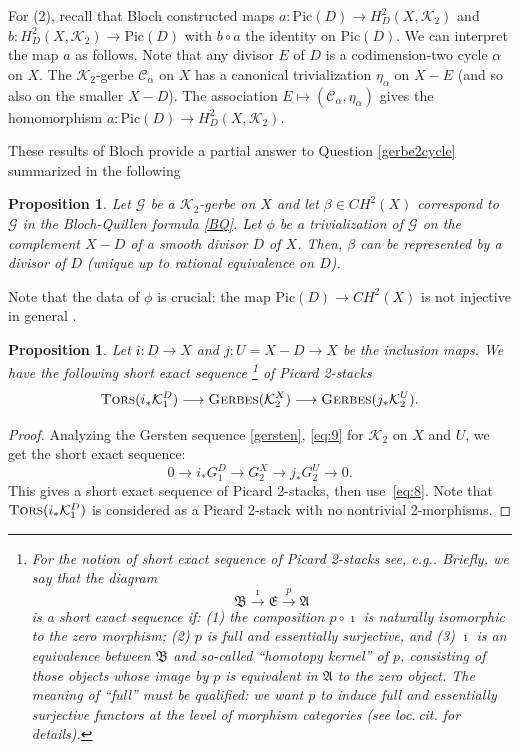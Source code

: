 \documentclass{amsart}
\numberwithin{equation}{subsection}
\newtheorem{proposition}[theorem]{Proposition}
\theoremstyle{remark}
\theoremstyle{remark}
\newcommand{\eg}{e.g.\xspace}
\newcommand{\loccit}{\textit{loc.\,cit.}\xspace}
\newcommand{\too}{\longrightarrow}%
\newcommand{\cC}{\mathcal{C}}
\newcommand{\cG}{\mathcal{G}}
\newcommand{\cK}{\mathcal{K}}
\newcommand{\fA}{\mathfrak{A}}
\newcommand{\fB}{\mathfrak{B}}
\newcommand{\fE}{\mathfrak{E}}
\DeclareMathOperator{\ger}{\textsc{Gerbes}} %
\DeclareMathOperator{\tors}{\textsc{Tors}} %
\begin{document}
For (2), recall that Bloch constructed maps $a: \mathrm{Pic}(D) \to H^2_D(X, \cK_2)$ and $b: H^2_D(X, \cK_2) \to \mathrm{Pic}(D)$ with $b\circ a$ the identity on $\mathrm{Pic}(D)$. We can interpret the map $a$ as follows. Note that any divisor $E$ of $D$ is a codimension-two cycle $\alpha$ on $X$. The $\cK_2$-gerbe $\cC_{\alpha}$ on $X$ has a canonical trivialization $\eta_{\alpha}$ on $X -E$ (and so also on the smaller $X-D$). The association $E \mapsto (\cC_{\alpha}, \eta_{\alpha})$ gives the homomorphism $a: \mathrm{Pic}(D) \to H^2_D(X, \cK_2)$.  

These results of Bloch provide a partial answer to Question \ref{gerbe2cycle} summarized in the following 
\begin{proposition}\label{gerbe2cyclea} Let $\cG$ be a $\cK_2$-gerbe on $X$ and let $\beta \in CH^2(X)$ correspond to $\cG$ in the Bloch-Quillen formula \eqref{BQ}.   Let $\phi$ be a trivialization of $\cG$ on the complement $X -D$ of a smooth divisor $D$ of $X$. Then, $\beta$ can be represented by a divisor of $D$ (unique up to rational equivalence on $D$). 
\end{proposition}
Note that the data of $\phi$ is crucial: the map $\mathrm{Pic}(D) \to CH^2(X)$
is not injective in general \cite[(iii), p.~269]{Bloch2}.
\begin{proposition}
  Let $i\colon D\to X$ and $j\colon U=X-D\to X$ be the inclusion maps.  We have the following short exact sequence \footnote{For the notion of short exact sequence of Picard 2-stacks see, \eg \cite{BertTat}. Briefly, we say that the diagram
\begin{equation*}
  \fB \overset{\imath}{\too} \fE \overset{p}{\too} \fA
\end{equation*}
is a short exact sequence if: (1) the composition $p\circ \imath$ is naturally isomorphic to the zero morphism; (2) $p$ is full and essentially surjective, and (3) $\imath$ is an equivalence between $\fB$ and so-called ``homotopy kernel'' of $p$, consisting of those objects whose image by $p$ is equivalent in $\fA$ to the zero object. The meaning of ``full'' must be qualified: we want $p$ to induce full and essentially surjective functors at the level of morphism categories (see \loccit for details).}
 of Picard 2-stacks
  \begin{equation*}
    \tors (i_*\cK_1^D) \too \ger (\cK_2^X) \too \ger (j_*\cK_2^U).
  \end{equation*}
\end{proposition}
\begin{proof}
  Analyzing the Gersten sequence \eqref{gersten}, \eqref{eq:9} for $\cK_2$ on
  $X$ and $U$, we get the short exact sequence:
  \begin{equation*}
    0\too i_*G_1^D \too  G_2^X \too j_*G_2^U \too 0.
  \end{equation*}
  This gives a short exact sequence of Picard 2-stacks, then
  use~\eqref{eq:8}. Note that $\tors (i_*\cK_1^D)$ is considered as a Picard
  2-stack with no nontrivial 2-morphisms.
\end{proof}
\end{document}

